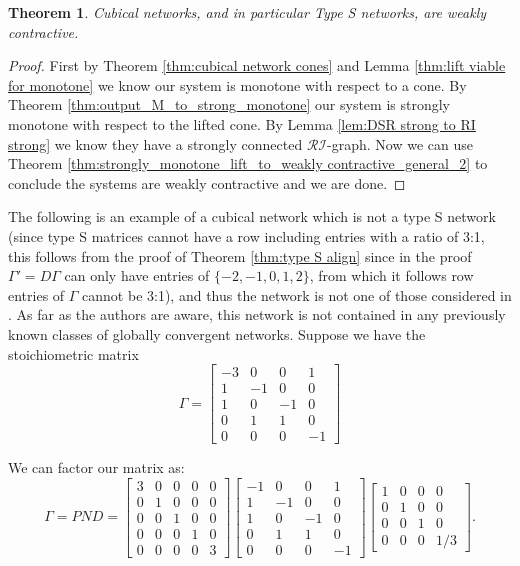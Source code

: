 \documentclass{article}
\newtheorem{thm}{Theorem}
\begin{document}
\begin{thm}
\label{thm:cubicals are weakly contractive}
    Cubical networks, and in particular Type S networks, are weakly contractive.
\end{thm}

\begin{proof}
 First by Theorem \ref{thm:cubical network cones} and Lemma \ref{thm:lift viable for monotone} we know our system is monotone with respect to a cone. By Theorem \ref{thm:output_M_to_strong_monotone} our system is strongly monotone with respect to the lifted cone. By Lemma \ref{lem:DSR strong to RI strong} we know they have a strongly connected \( \mathcal{RI} \)-graph. Now we can use Theorem \ref{thm:strongly_monotone_lift_to_weakly contractive_general_2} to conclude the systems are weakly contractive and we are done.
 
\end{proof}

The following is an example of a cubical network which is not a type S network (since type S matrices cannot have a row including entries with a ratio of 3:1, this follows from the proof of Theorem \ref{thm:type S align} since in the proof $\Gamma' = D \Gamma $ can only have entries of $\{-2,-1,0,1,2\}$, from which it follows row entries of $\Gamma$ cannot be 3:1), and thus the network is not one of those considered in \cite{BANAJI20131359}. As far as the authors are aware, this network is not contained in any previously known classes of globally convergent networks. Suppose we have the stoichiometric matrix
$$\Gamma = \begin{bmatrix}
    -3 & 0 & 0 & 1 \\
    1 & -1 & 0 & 0 \\
    1 & 0 & -1 & 0 \\
    0 & 1 & 1 & 0 \\
    0 & 0 & 0 & -1
\end{bmatrix}$$

We can factor our matrix as:
\[
\Gamma = PND = 
    \begin{bmatrix}
    3 & 0 & 0 & 0 & 0\\
    0 & 1 & 0 & 0 & 0 \\
    0 & 0 & 1 & 0 & 0 \\
    0 & 0 & 0 & 1 & 0 \\
    0 & 0 & 0 & 0 & 3
\end{bmatrix}
\begin{bmatrix}
    -1 & 0 & 0 & 1 \\
    1 & -1 & 0 & 0 \\
    1 & 0 & -1 & 0 \\
    0 & 1 & 1 & 0 \\
    0 & 0 & 0 & -1
\end{bmatrix}
\begin{bmatrix}
    1 & 0 & 0 & 0 \\
    0 & 1 & 0 & 0 \\
    0 & 0 & 1 & 0 \\
    0 & 0 & 0 & 1/3
\end{bmatrix}.
\]
\end{document}
